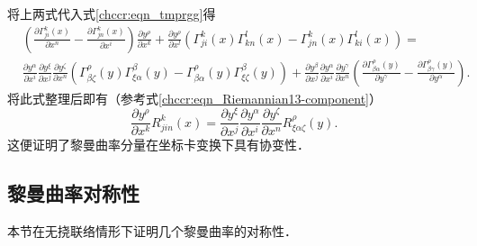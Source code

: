 将上两式代入式\eqref{chccr:eqn_tmprgg}得
\begin{align*}
    &\left(\frac{\partial \Gamma^{k}_{ji}(x)} {\partial x^n} -\frac{\partial \Gamma^{k}_{jn}(x)}{\partial x^i}\right)
    \frac{\partial y^\rho}{\partial x^k} +
\frac{\partial y^\rho}{\partial x^l} \left(\Gamma^{k}_{ji}(x)\Gamma^{l}_{kn}(x)
- \Gamma^{k}_{jn}(x) \Gamma^{l}_{ki}(x) \right) =\\
    & \frac{\partial y^\alpha}{\partial x^i}
    \frac{\partial y^\xi}{\partial x^j}  \frac{\partial y^\zeta}{\partial x^n}
    \left(\Gamma^{\rho}_{\beta\zeta}(y) \Gamma^{\beta}_{\xi\alpha}(y)
    -\Gamma^{\rho}_{\beta\alpha}(y) \Gamma^{\beta}_{\xi\zeta}(y)\right)
    +\frac{\partial y^\beta}{\partial x^j} \frac{\partial y^\alpha}
    {\partial x^i} \frac{\partial y^\gamma}{\partial x^n}
    \left( \frac{\partial\Gamma^{\rho}_{\beta\alpha}(y)}{\partial y^\gamma}
    - \frac{\partial\Gamma^{\rho}_{\beta\gamma}(y)}{\partial y^\alpha} \right) .
\end{align*}  %
将此式整理后即有（参考式\eqref{chccr:eqn_Riemannian13-component}）
\begin{equation}
    \dfrac{\partial y^\rho}{\partial x^k}R^k_{jin}(x)=
    \dfrac{\partial y^\xi}{\partial x^j}\dfrac{\partial y^\alpha}{\partial x^i}
    \dfrac{\partial y^\zeta}{\partial x^n}R^\rho_{\xi\alpha\zeta}(y) .
\end{equation}
这便证明了黎曼曲率分量在坐标卡变换下具有协变性．



\subsection{黎曼曲率对称性}\label{chccr:sec_riemann-sym}
本节在{\kaishu 无挠联络}情形下证明几个黎曼曲率的对称性．


